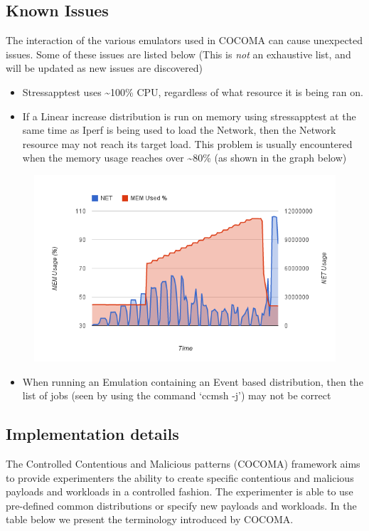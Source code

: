 \documentclass[letterpaper,10pt,english]{sphinxhowto}
\begin{document}
\subsection{Known Issues}
\label{COCOMA/08_known_issues:known-issues}\label{COCOMA/08_known_issues::doc}
The interaction of the various emulators used in COCOMA can cause unexpected issues. Some of these issues are listed below (This is \emph{not} an exhaustive list, and will be updated as new issues are discovered)
\begin{itemize}
\item {} 
Stressapptest uses \textasciitilde{}100\% CPU, regardless of what resource it is being ran on.

\item {} 
If a Linear increase distribution is run on memory using stressapptest at the same time as Iperf is being used to load the Network, then the Network resource may not reach its target load. This problem is usually encountered when the memory usage reaches over \textasciitilde{}80\% (as shown in the graph below)

\end{itemize}
\begin{figure}[htbp]
\centering

\includegraphics{MEM_NET-Problem.png}
\end{figure}
\begin{itemize}
\item {} 
When running an Emulation containing an Event based distribution, then the list of jobs (seen by using the command `ccmsh -j') may not be correct

\end{itemize}


\subsection{Implementation details}
\label{COCOMA/10_implementation_details:implementation-details}\label{COCOMA/10_implementation_details::doc}
The Controlled Contentious and Malicious patterns (COCOMA) framework aims to provide experimenters the ability to create specific contentious and malicious payloads and workloads in a controlled fashion. The experimenter is able to use pre-defined common distributions or specify new payloads and workloads. In the table below we present the terminology introduced by COCOMA.
\end{document}
